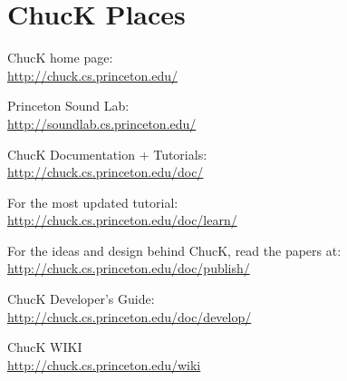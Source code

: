 \newpage
\section{ChucK Places}


ChucK home page:\\
\urltab    \href{http://chuck.cs.princeton.edu/}{http://chuck.cs.princeton.edu/}

Princeton Sound Lab:\\
\urltab    \href{http://soundlab.cs.princeton.edu/}{http://soundlab.cs.princeton.edu/}  
    
ChucK Documentation + Tutorials:\\
\urltab    \href{http://chuck.cs.princeton.edu/doc/}{http://chuck.cs.princeton.edu/doc/}
    
For the most updated tutorial:\\
\urltab    \href{http://chuck.cs.princeton.edu/doc/learn/}{http://chuck.cs.princeton.edu/doc/learn/}
    
For the ideas and design behind ChucK, read the papers at:\\
\urltab    \href{http://chuck.cs.princeton.edu/doc/publish/}{http://chuck.cs.princeton.edu/doc/publish/}
    
ChucK Developer's Guide:\\
\urltab    \href{http://chuck.cs.princeton.edu/doc/develop/}{http://chuck.cs.princeton.edu/doc/develop/}

ChucK WIKI\\
\urltab    \href{http://chuck.cs.princeton.edu/wiki}{http://chuck.cs.princeton.edu/wiki}